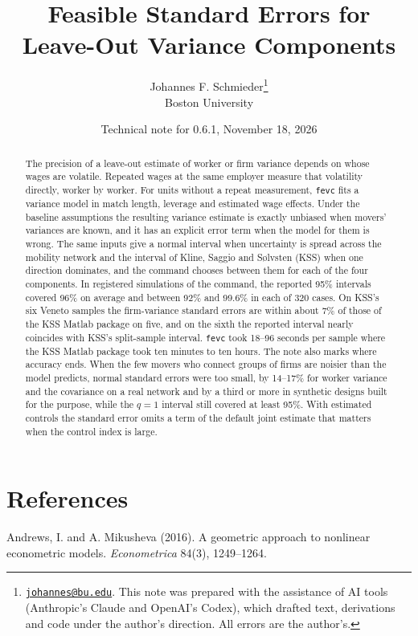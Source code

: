 \documentclass[11pt,letterpaper]{article}
\title{\vspace{-1.8cm}Feasible Standard Errors for\\ Leave-Out Variance Components}
\author{Johannes F. Schmieder\thanks{\href{mailto:johannes@bu.edu}{\texttt{johannes@bu.edu}}. This note was prepared
 with the assistance of AI tools (Anthropic's Claude and OpenAI's Codex), which drafted text, derivations and code
 under the author's direction. All errors are the author's.}\\[2pt] {\normalsize Boston University}}
\date{Technical note for \fevc{} 0.6.1, November 18, 2026}
\makeatletter
\newcommand{\fevc}{\texorpdfstring{\texttt{fevc}}{fevc}}
\newcommand{\compactcontents}{\begingroup\small
  \renewcommand*\l@section{\@dottedtocline{1}{0em}{2em}}%
  \tableofcontents\endgroup}
\makeatother
\begin{document}
\maketitle
\vspace{-0.8cm}
\begin{abstract}
The precision of a leave-out estimate of worker or firm variance depends on
whose wages are volatile. Repeated wages at the same employer measure that
volatility directly, worker by worker. For units without a repeat measurement,
\fevc{} fits a variance model in match length, leverage and estimated wage effects.
Under the baseline assumptions the resulting variance estimate is exactly unbiased
when movers' variances are known, and it has an explicit error term when the model
for them is wrong. The same inputs
give a normal interval when uncertainty is spread across the mobility network and
the interval of Kline, Saggio and S{\o}lvsten (KSS) when one direction dominates,
and the command chooses between them for each of the four components. In
registered simulations of the command, the reported 95\% intervals covered 96\% on
average and between 92\% and 99.6\% in each of 320 cases. On KSS's six Veneto
samples the firm-variance standard errors are within about 7\% of those of the KSS
Matlab package on five, and on the sixth the reported interval nearly coincides
with KSS's split-sample interval. \fevc{} took 18--96 seconds per sample where the
KSS Matlab package took ten minutes to ten hours. The note also marks where
accuracy ends. When the few movers who connect groups of firms are noisier than the
model predicts, normal standard errors were too small, by 14--17\% for worker
variance and the covariance on a real network and by a third or more in synthetic
designs built for the purpose, while the $q=1$ interval still covered at least
95\%. With estimated controls the standard error omits a term of the default joint
estimate that matters when the control index is large.
\end{abstract}
\compactcontents
\clearpage






\section*{References}
Andrews, I. and A. Mikusheva (2016). A geometric approach to nonlinear econometric models. \emph{Econometrica}
84(3), 1249--1264.
\end{document}
